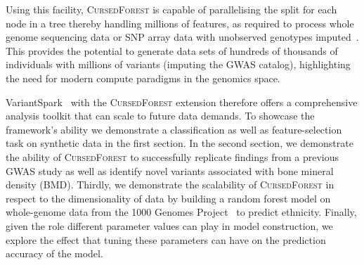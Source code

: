 \documentclass[10pt,letterpaper]{article}
\let\oldmarginpar\marginpar
\renewcommand\marginpar[1]{\-\oldmarginpar[\raggedleft\footnotesize #1]%
{\raggedright\footnotesize #1}}
\newcommand{\cursedforest}{\textsc{CursedForest}\xspace}
\newcommand{\mtry}{\texttt{mtry}\xspace}
\newcommand{\ntree}{\texttt{ntree}\xspace}
\begin{document}
Using this facility, \cursedforest is capable of parallelising the split for each node in a tree thereby handling millions 
of features, as required to process whole genome sequencing data or SNP array data with unobserved genotypes 
imputed~\cite{Howie2012}.  This provides the potential to generate data sets of hundreds of thousands of individuals 
with millions of variants (imputing the GWAS catalog), highlighting the need for modern
compute paradigms in the genomics space.


VariantSpark~\cite{OBrien2015} with the \cursedforest extension therefore offers a
comprehensive analysis toolkit that can scale to future data demands. To showcase the framework's ability we demonstrate
a classification as well as feature-selection task on synthetic data in the first section. In the second section, we demonstrate the ability of
\cursedforest to successfully replicate findings from a previous GWAS study as well as identify novel variants associated with bone 
mineral density (BMD). 
Thirdly, we demonstrate the scalability of \cursedforest in respect to the dimensionality of data by building a random
forest model on whole-genome data from the 1000 Genomes Project~\cite{1KG2012} to predict ethnicity.
Finally, given the role different parameter values can play in model construction, we explore the effect that tuning these
parameters can have on the prediction accuracy of the model.
\end{document}
